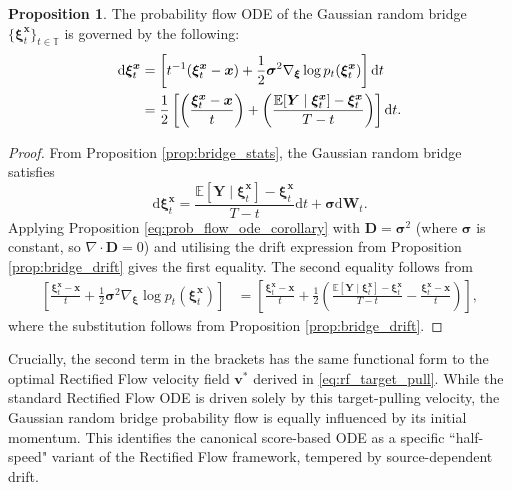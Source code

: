 \documentclass{article}
\theoremstyle{definition}
\newtheorem{proposition}{Proposition}[section]
\begin{document}
\begin{proposition}\label{cor:prob_flow_ode}
    The probability flow ODE of the Gaussian random bridge $\{\boldsymbol{\xi}^{\boldsymbol{x}}_t\}_{t \in \mathbb{T}}$ is governed by the following:
    \begin{align} \label{eq:prob_flow_ode}
        \mathrm{d}\boldsymbol{\xi}^{\boldsymbol{x}}_t &= \left[ t^{-1}(\boldsymbol{\xi}^{\boldsymbol{x}}_t - \boldsymbol{x}) + \frac{1}{2} \boldsymbol{\sigma}^2 \nabla_{\boldsymbol{\xi}} \log p_t( \boldsymbol{\xi}^{\boldsymbol{x}}_t )\right] \mathrm{d}t \notag \\
        &= \frac{1}{2} \left[ \left( \frac{\boldsymbol{\xi}^{\boldsymbol{x}}_t - \boldsymbol{x}}{t} \right) + \left( \frac{\mathbb{E}[\boldsymbol{Y} \mid \boldsymbol{\xi}^{\boldsymbol{x}}_t] - \boldsymbol{\xi}^{\boldsymbol{x}}_t}{T-t} \right) \right] \mathrm{d}t.
    \end{align}
\end{proposition}

\begin{proof}
    From Proposition \ref{prop:bridge_stats}, the Gaussian random bridge satisfies
    \begin{equation*}
        \mathrm{d}\boldsymbol{\xi}^{\boldsymbol{x}}_t = \frac{\mathbb{E}[\boldsymbol{Y} \mid \boldsymbol{\xi}^{\boldsymbol{x}}_t] - \boldsymbol{\xi}^{\boldsymbol{x}}_t}{T-t} \mathrm{d}t + \boldsymbol{\sigma} \mathrm{d}\mathbf{W}_t.
    \end{equation*}
    Applying Proposition \ref{eq:prob_flow_ode_corollary} with $\mathbf{D} = \boldsymbol{\sigma}^2$ (where $\boldsymbol{\sigma}$ is constant, so $\nabla \cdot \mathbf{D} = 0$) and utilising the drift expression from Proposition \ref{prop:bridge_drift} gives the first equality. The second equality follows from
    \begin{align*}
        \left[ \frac{\boldsymbol{\xi}^{\boldsymbol{x}}_t - \boldsymbol{x}}{t} + \frac{1}{2} \boldsymbol{\sigma}^2 \nabla_{\boldsymbol{\xi}} \log p_t( \boldsymbol{\xi}^{\boldsymbol{x}}_t ) \right]  &= \left[ \frac{\boldsymbol{\xi}^{\boldsymbol{x}}_t - \boldsymbol{x}}{t} + \frac{1}{2} \left( \frac{\mathbb{E}[\boldsymbol{Y} \mid \boldsymbol{\xi}^{\boldsymbol{x}}_t] - \boldsymbol{\xi}^{\boldsymbol{x}}_t}{T-t} - \frac{\boldsymbol{\xi}^{\boldsymbol{x}}_t - \boldsymbol{x}}{t} \right) \right],
    \end{align*}
		where the substitution follows from Proposition \ref{prop:bridge_drift}.
\end{proof}
Crucially, the second term in the brackets has the same functional form to the optimal Rectified Flow velocity field $\boldsymbol{v}^*$ derived in \eqref{eq:rf_target_pull}. While the standard Rectified Flow ODE is driven solely by this target-pulling velocity, the Gaussian random bridge probability flow is equally influenced by its initial momentum. This identifies the canonical score-based ODE as a specific ``half-speed" variant of the Rectified Flow framework, tempered by source-dependent drift.
\end{document}
